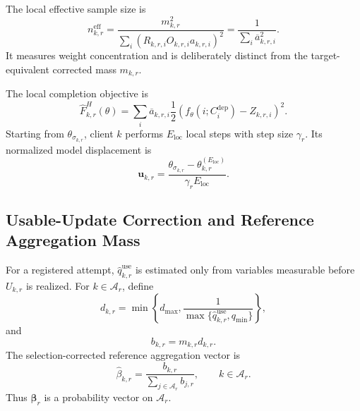 \documentclass[letterpaper,journal]{IEEEtran}
\begin{document}
The local effective sample size is
\begin{equation}
 n^{\mathrm{eff}}_{k,r}
 =
 \frac{m_{k,r}^2}
 {\sum_i
  (R_{k,r,i}O_{k,r,i}a_{k,r,i})^2}
 =
 \frac{1}{\sum_i\overline a_{k,r,i}^2}.
 \label{eq:neff}
\end{equation}
It measures weight concentration and is deliberately distinct from the
target-equivalent corrected mass $m_{k,r}$.

The local completion objective is
\begin{equation}
 \widehat F^{H}_{k,r}(\theta)
 =
 \sum_i
 \overline a_{k,r,i}
 \frac{1}{2}
 \left(
 f_{\theta}(i;C_i^{\mathrm{dep}})
 -
 Z_{k,r,i}
 \right)^2.
 \label{eq:local_hajek_objective}
\end{equation}
Starting from $\theta_{\sigma_{k,r}}$, client $k$ performs
$E_{\mathrm{loc}}$ local steps with step size $\gamma_r$.  Its normalized model
displacement is
\begin{equation}
 \mathbf{u}_{k,r}
 =
 \frac{
 \theta_{\sigma_{k,r}}
 -
 \theta^{(E_{\mathrm{loc}})}_{k,r}
 }{\gamma_r E_{\mathrm{loc}}}.
 \label{eq:normalized_update}
\end{equation}

\subsection{Usable-Update Correction and Reference Aggregation Mass}
\label{subsec:usable_correction}

For a registered attempt, $\widehat q^{\mathrm{use}}_{k,r}$ is estimated only
from variables measurable before $U_{k,r}$ is realized.  For
$k\in\mathcal{A}_r$, define
\begin{equation}
 d_{k,r}
 =
 \min\!\left\{
 d_{\max},
 \frac{1}
 {\max\{\widehat q^{\mathrm{use}}_{k,r},q_{\min}\}}
 \right\},
 \label{eq:d_use}
\end{equation}
and
\begin{equation}
    b_{k,r}=m_{k,r}d_{k,r}.
    \label{eq:b_mass}
\end{equation}
The selection-corrected reference aggregation vector is
\begin{equation}
 \widehat\beta_{k,r}
 =
 \frac{b_{k,r}}
 {\sum_{j\in\mathcal{A}_r}b_{j,r}},
 \qquad
 k\in\mathcal{A}_r.
 \label{eq:beta_ref}
\end{equation}
Thus $\widehat{\boldsymbol\beta}_r$ is a probability vector on
$\mathcal{A}_r$.
\end{document}
